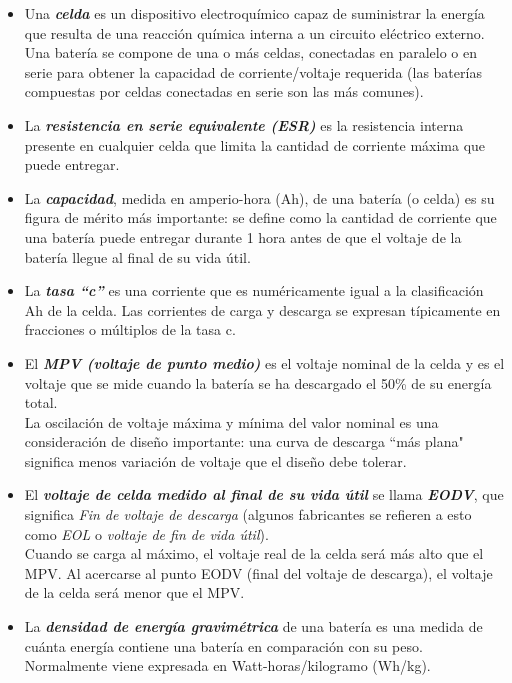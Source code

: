 \documentclass[12pt]{article}
\begin{document}
	\begin{itemize}
		\item  Una \textit{\textbf{celda}} es un dispositivo electroquímico capaz de suministrar la energía que resulta de una reacción química interna a un circuito eléctrico externo. \\
		Una batería se compone de una o más celdas, conectadas en paralelo o en serie para obtener la capacidad de corriente/voltaje requerida (las baterías compuestas por celdas conectadas en serie son las más comunes).
		\item La \textit{\textbf{resistencia en serie equivalente (ESR)}} es la resistencia interna presente en cualquier celda que limita la cantidad de corriente máxima que puede entregar.
		\item La \textit{\textbf{capacidad}}, medida en amperio-hora (Ah), de una batería (o celda) es su figura de mérito más importante: se define como la cantidad de corriente que una batería puede entregar durante 1 hora antes de que el voltaje de la batería llegue al final de su vida útil. 
 		\item La \textit{\textbf{tasa ``c''}}  es una corriente que es numéricamente igual a la clasificación Ah de la celda. Las corrientes de carga y descarga se expresan típicamente en fracciones o múltiplos de la tasa c. 
 		\item El \textit{\textbf{MPV (voltaje de punto medio)}} es el voltaje nominal de la celda y es el voltaje que se mide cuando la batería se ha descargado el 50\% de su energía total. \\
 		\noindent La oscilación de voltaje máxima y mínima del valor nominal es una consideración de diseño importante: una curva de descarga ``más plana" significa menos variación de voltaje que el diseño debe tolerar.
 		\item El \textit{\textbf{voltaje de celda medido al final de su vida útil}} se llama \textit{\textbf{EODV}}, que significa \textit{Fin de voltaje de descarga} (algunos fabricantes se refieren a esto como \textit{EOL} o \textit{voltaje de fin de vida útil}). \\
 		\noindent Cuando se carga al máximo, el voltaje real de la celda será más alto que el MPV. Al acercarse al punto EODV (final del voltaje de descarga), el voltaje de la celda será menor que el MPV. 
 		\item La \textit{\textbf{densidad de energía gravimétrica}} de una batería es una medida de cuánta energía contiene una batería en comparación con su peso. Normalmente viene expresada en Watt-horas/kilogramo (Wh/kg).

\end{itemize}
\end{document}
